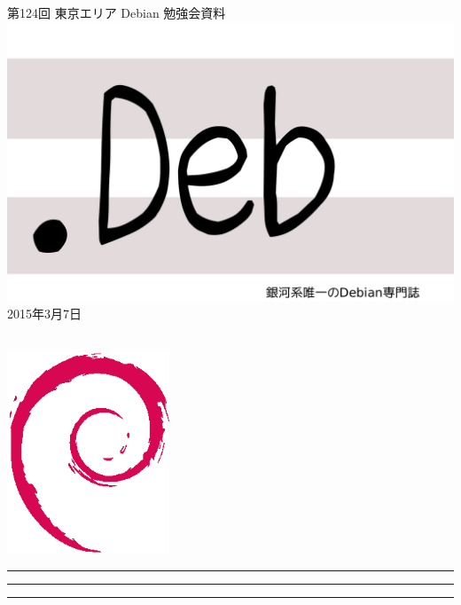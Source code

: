 \documentclass[mingoth,a4paper]{jsarticle}
\newcommand{\debmtgyear}{2015}
\newcommand{\debmtgmonth}{3}
\newcommand{\debmtgdate}{7}
\newcommand{\debmtgnumber}{124}
\begin{document}
\begin{titlepage}
\thispagestyle{empty}

\vspace*{-2cm}
第\debmtgnumber{}回 東京エリア Debian 勉強会資料\\
\hspace*{-2cm}
\includegraphics{image2012-natsu/dotdeb.pdf}\\
\hfill{}\debmtgyear{}年\debmtgmonth{}月\debmtgdate{}日

\\

\vspace*{-2cm}
\hfill{}\includegraphics[height=6cm]{image200502/openlogo-nd.eps}
\end{titlepage}

\newpage

\begin{minipage}[b]{0.2\hsize}
 \colorbox{titleback}{}
\end{minipage}
\begin{minipage}[b]{0.8\hsize}
\hrule
\vspace{2mm}
\hrule
\begin{multicols}{2}
\tableofcontents
\end{multicols}
\vspace{2mm}
\hrule
\end{minipage}
\end{document}
